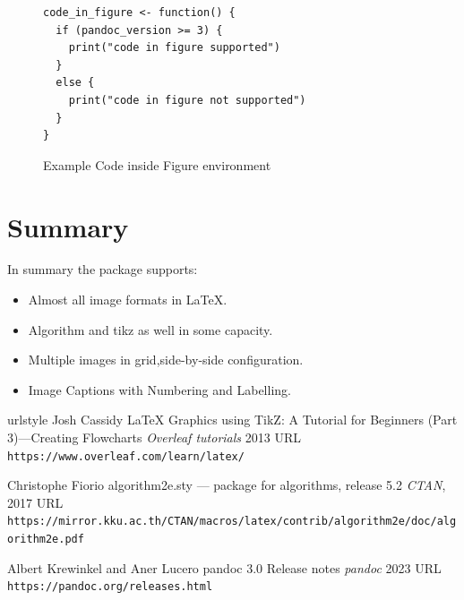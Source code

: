 \begin{figure}[htbp]
\begin{center}
\begin{verbatim}
code_in_figure <- function() {
  if (pandoc_version >= 3) {
    print("code in figure supported")
  }
  else {
    print("code in figure not supported")
  }
}
\end{verbatim}
\caption{ Example Code inside Figure environment}
\label{code:example}
\end{center}
\end{figure}
\section{Summary}

In summary the  package supports:
\begin{itemize}
\item Almost all image formats in LaTeX.
\item Algorithm and tikz as well in some capacity.
\item Multiple images in grid,side-by-side configuration.
\item Image Captions with Numbering and Labelling.
\end{itemize}



\begin{thebibliography}{4}
    \providecommand{\natexlab}[1]{#1}
    \providecommand{\url}[1]{\texttt{#1}}
    \expandafter\ifx\csname urlstyle\endcsname\relax
      \providecommand{\doi}[1]{doi: #1}\else
      \providecommand{\doi}{doi: \begingroup \urlstyle{rm}\Url}\fi
{}
Josh Cassidy
\newblock LaTeX Graphics using TikZ: A Tutorial for Beginners (Part 3)—Creating Flowcharts
\newblock \emph{Overleaf tutorials}  2013
\newblock URL \url{https://www.overleaf.com/learn/latex/}

Christophe Fiorio
\newblock algorithm2e.sty — package for algorithms, release 5.2
\newblock \emph{CTAN}, 2017
\newblock URL \url{https://mirror.kku.ac.th/CTAN/macros/latex/contrib/algorithm2e/doc/algorithm2e.pdf}

Albert Krewinkel and Aner Lucero
\newblock pandoc 3.0 Release notes
\newblock \emph{pandoc}  2023
\newblock URL \url{https://pandoc.org/releases.html}

\end{thebibliography}


\address{%
Abhishek Ulayil\\
Student, Institute of Actuaries of India\\%
Mumbai, India\\
ORCiD: 0009-0000-6935-8690\\
}
